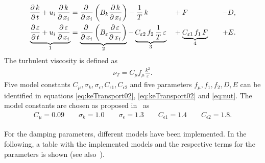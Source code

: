 \begin{alignat}{4} \label{eq:keTransport02}
		\frac{\partial\,k}{\partial\,t} + u_i\,\frac{\partial\,k}{\partial\,x_i}
		&=
		\frac{\partial\,}{\partial\,x_i}\left(  B_k \frac{\partial\,k}{\partial\,x_i} \right) 
		-
		\frac{1}{T}\,k
		&&+
		F
		&&&-
		D, \\ \label{eq:keTransport03}
		\underbrace{\frac{\partial\,\varepsilon}{\partial\,t} + u_i\,\frac{\partial\,\varepsilon}{\partial\,x_i}}_{1}
		&=
		\underbrace{\frac{\partial\,}{\partial\,x_i}\left( B_\varepsilon \frac{\partial\,\varepsilon}{\partial\,x_i} \right)}_{2} 
		-
		\underbrace{C_{\varepsilon 2}\,f_2\,\frac{1}{T}\,\varepsilon}_{3}
		&&+
		\underbrace{C_{\varepsilon 1}\,f_1\,F}_{4}
		&&&+
		E.
\end{alignat}
The turbulent viscosity is defined as
\begin{align}
\label{eq:nut}
	\nu_T = C_\mu f_\mu \frac{k^2}{\varepsilon}.
\end{align}
Five model constants $C_{\mu}, \sigma_k, \sigma_{\epsilon}, C_{\epsilon 1}, C_{\epsilon 2}$ and five parameters $f_{\mu}, f_1, f_2, D, E$ can be identified in equations \ref{eq:keTransport02}, \ref{eq:keTransport02} and \ref{eq:nut}. The model constants are chosen as proposed in~\citep{fan1993} as
\begin{align}\label{equ:constants}
    C_{\mu} = 0.09 \qquad
    \sigma_k = 1.0 \qquad
    \sigma_{\epsilon} = 1.3 \qquad
    C_{\epsilon 1} = 1.4 \qquad
    C_{\epsilon 2} = 1.8 .	
\end{align}

\noii For the damping parameters, different models have been implemented. In the following, a table with the implemented models and the respective terms for the parameters is shown (see also~\citep{fan1993}).

\vspace{1cm}

